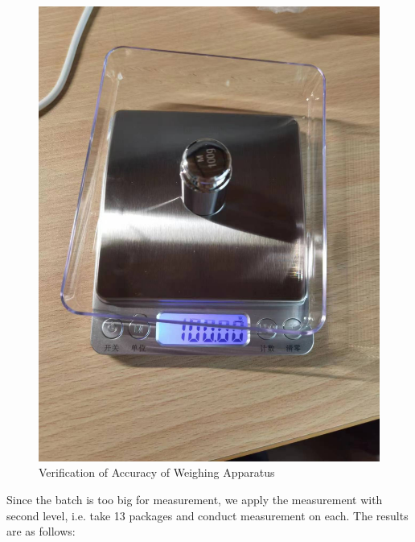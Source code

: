 \documentclass[12pt]{article}
\begin{document}
\begin{figure}[htbp]
    \centering
    \includegraphics[scale=0.1]{img/verification.jpg}
    \caption{Verification of Accuracy of Weighing Apparatus}
\end{figure}

Since the batch is too big for measurement, we apply the measurement with second level, i.e. take 13 packages and conduct measurement on each. The results are as follows:
\end{document}
